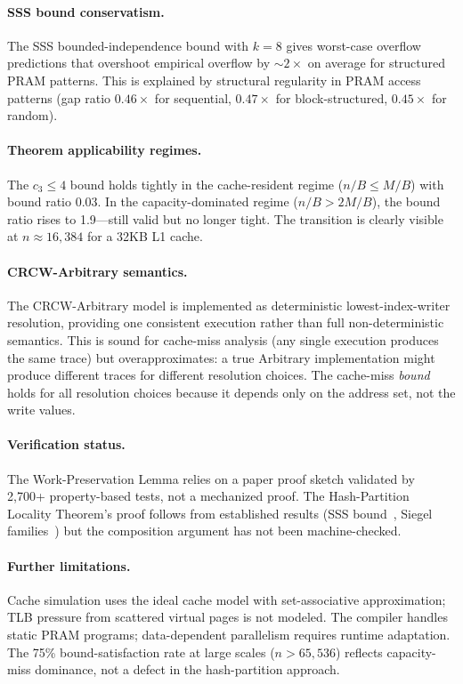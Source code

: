 \documentclass[11pt]{article}
\begin{document}
\paragraph{SSS bound conservatism.}
The SSS bounded-independence bound with $k = 8$ gives worst-case overflow
predictions that overshoot empirical overflow by ${\sim}2\times$ on
average for structured PRAM patterns.  This is explained by structural
regularity in PRAM access patterns (gap ratio $0.46\times$ for
sequential, $0.47\times$ for block-structured, $0.45\times$ for random).

\paragraph{Theorem applicability regimes.}
The $c_3 \le 4$ bound holds tightly in the cache-resident regime
($n/B \le M/B$) with bound ratio 0.03.  In the capacity-dominated
regime ($n/B > 2M/B$), the bound ratio rises to 1.9---still valid but
no longer tight.  The transition is clearly visible at $n \approx
16{,}384$ for a 32KB L1 cache.

\paragraph{CRCW-Arbitrary semantics.}
The CRCW-Arbitrary model is implemented as deterministic lowest-index-writer
resolution, providing one consistent execution rather than full
non-deterministic semantics.  This is sound for cache-miss analysis (any
single execution produces the same trace) but overapproximates: a
true Arbitrary implementation might produce different traces for
different resolution choices.  The cache-miss \emph{bound} holds for
all resolution choices because it depends only on the address set, not
the write values.

\paragraph{Verification status.}
The Work-Preservation Lemma relies on a paper proof sketch validated by
2,700+ property-based tests, not a mechanized proof.  The Hash-Partition
Locality Theorem's proof follows from established results (SSS
bound~\cite{schmidt1995chernoff}, Siegel families~\cite{siegel2004universal})
but the composition argument has not been machine-checked.

\paragraph{Further limitations.}
Cache simulation uses the ideal cache model with set-associative
approximation; TLB pressure from scattered virtual pages is not modeled.
The compiler handles static PRAM programs; data-dependent parallelism
requires runtime adaptation.  The 75\% bound-satisfaction rate at large
scales ($n > 65{,}536$) reflects capacity-miss dominance, not a defect
in the hash-partition approach.
\end{document}
